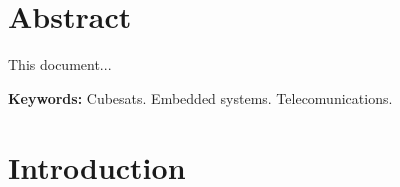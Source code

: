 \documentclass[12pt]{book}
\begin{document}

\chapter*{Abstract}

This document...

\smallskip
\noindent \textbf{Keywords:} Cubesats. Embedded systems. Telecomunications.

\tableofcontents


\listoffigures
{}


\listoftables
{}


\printnomenclature
{}


\chapter{Introduction}
\end{document}
